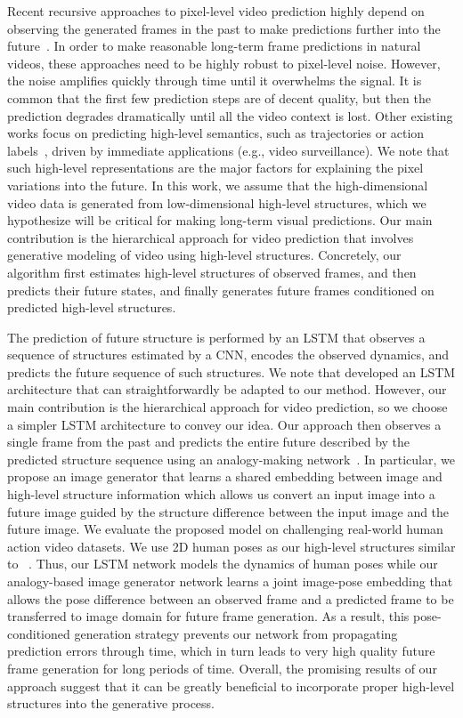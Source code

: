 \documentclass{article}
\begin{document}
Recent recursive approaches to pixel-level video prediction highly depend on observing the generated frames in the past to make predictions further into the future~\cite{Oh15,Mathieu16,Goroshin15,Srivastava15,Ranzato14,FinnGL16,Villegas17,Lotter17}.
In order to make reasonable long-term frame predictions in natural videos, these approaches need to be highly robust to pixel-level noise. However, the noise amplifies quickly through time until it overwhelms the signal.
It is common that the first few prediction steps are of decent quality, but then the prediction degrades dramatically until all the video context is lost.
Other existing works focus on predicting high-level semantics, such as trajectories or action labels~\cite{Walker14,chao:cvpr2017,yuen2010data,lee2015modeling}, driven by immediate applications (e.g., video surveillance).
We note that such high-level representations are the major factors for explaining the pixel variations into the future.
In this work, we assume that the high-dimensional video data is generated from low-dimensional high-level structures, which we hypothesize will be critical for making long-term visual predictions.
Our main contribution is the hierarchical approach for video prediction that involves generative modeling of video using high-level structures.
Concretely, our algorithm first estimates high-level structures of observed frames, and then predicts their future states, and finally generates future frames conditioned on predicted high-level structures.

The prediction of future structure is performed by an LSTM that observes a sequence of structures estimated by a CNN, encodes the observed dynamics, and predicts the future sequence of such structures.
We note that \citet{Fragkiadaki} developed an LSTM architecture that can straightforwardly be adapted to our method.
However, our main contribution is the hierarchical approach for video prediction, so we choose a simpler LSTM architecture to convey our idea.
Our approach then observes a single frame from the past and predicts the entire future described by the predicted structure sequence using an analogy-making network~\cite{reed2015deep}.
In particular, we propose an image generator that learns a shared embedding between image and high-level structure information which allows us convert an input image into a future image guided by the structure difference between the input image and the future image.
We evaluate the proposed model on challenging real-world human action video datasets.
We use 2D human poses as our high-level structures similar to ~\citet{reed2016learning}.
Thus, our LSTM network models the dynamics of human poses while our analogy-based image generator network learns a joint image-pose embedding that allows the pose difference between an observed frame and a predicted frame to be transferred to image domain for future frame generation.
As a result, this pose-conditioned generation strategy prevents our network from propagating prediction errors through time, which in turn leads to very high quality future frame generation for long periods of time. 
Overall, the promising results of our approach suggest that it can be greatly beneficial to incorporate proper high-level structures into the generative process. 
\end{document}
